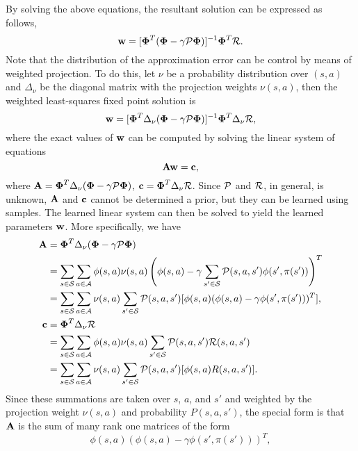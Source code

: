 By solving the above equations, the resultant solution can be expressed as follows,
\begin{equation}
    {\mathbf w} = [\boldsymbol{\Phi}^T(\boldsymbol{\Phi}-\gamma\mathcal{P}\boldsymbol{\Phi})]^{-1}\boldsymbol{\Phi}^T\mathcal{R}.
\end{equation}
Note that the distribution of the approximation error can be control by means of weighted projection. To do this, let $\nu$ be a probability distribution over $(s,a)$ and $\Delta_\nu$ be the diagonal matrix with the projection weights $\nu(s,a)$, then the weighted least-squares fixed point solution is \cite{lagoudakis:2003}
\begin{equation}
    {\mathbf w} = [\boldsymbol{\Phi}^T\Delta_\nu(\boldsymbol{\Phi}-\gamma\mathcal{P}\boldsymbol{\Phi})]^{-1}\boldsymbol{\Phi}^T\Delta_\nu\mathcal{R},
\end{equation}
where the exact values of ${\mathbf w}$ can be computed by solving the linear system of equations
\begin{equation}
    {\mathbf A}{\mathbf w} = {\mathbf c},
\end{equation}
where ${\mathbf A} = \boldsymbol{\Phi}^T\Delta_\nu(\boldsymbol{\Phi}-\gamma\mathcal{P}\boldsymbol{\Phi})$, ${\mathbf c} = \boldsymbol{\Phi}^T\Delta_\nu\mathcal{R}$. Since $\mathcal{P}$ and $\mathcal{R}$, in general, is unknown, ${\mathbf A}$ and ${\mathbf c}$ cannot be determined a prior, but they can be learned using samples. The learned linear system can then be solved to yield the learned parameters ${\mathbf w}$. More specifically, we have
\begin{align}\label{eq: machine learning summation}
    {\mathbf A} &= \boldsymbol{\Phi}^T\Delta_\nu(\boldsymbol{\Phi}-\gamma\mathcal{P}\boldsymbol{\Phi}) \\
        &= \sum_{s\in\mathcal{S}}\sum_{a\in\mathcal{A}} \phi(s,a)\nu(s,a)\left(\phi(s,a)-\gamma\sum_{s'\in\mathcal{S}}\mathcal{P}(s,a,s')\phi(s',\pi(s'))\right)^T \\
        &= \sum_{s\in\mathcal{S}}\sum_{a\in\mathcal{A}}\nu(s,a)\sum_{s'\in\mathcal{S}}\mathcal{P}(s,a,s')[\phi(s,a)(\phi(s,a)-\gamma\phi(s',\pi(s')))^T],\\
    {\mathbf c} &= \boldsymbol{\Phi}^T\Delta_\nu\mathcal{R} \\
        &= \sum_{s\in\mathcal{S}}\sum_{a\in\mathcal{A}}\phi(s,a)\nu(s,a)\sum_{s'\in\mathcal{S}}\mathcal{P}(s,a,s')\mathcal{R}(s,a,s') \\
        &= \sum_{s\in\mathcal{S}}\sum_{a\in\mathcal{A}}\nu(s,a)\sum_{s'\in\mathcal{S}}\mathcal{P}(s,a,s')[\phi(s,a)R(s,a,s')].
\end{align}
Since these summations are taken over $s$, $a$, and $s'$ and weighted by the projection weight $\nu(s,a)$ and probability $P(s,a,s')$, the special form is that ${\mathbf A}$ is the sum of many rank one matrices of the form
\begin{equation}
    \phi(s,a)(\phi(s,a)-\gamma\phi(s',\pi(s')))^T,
\end{equation}
